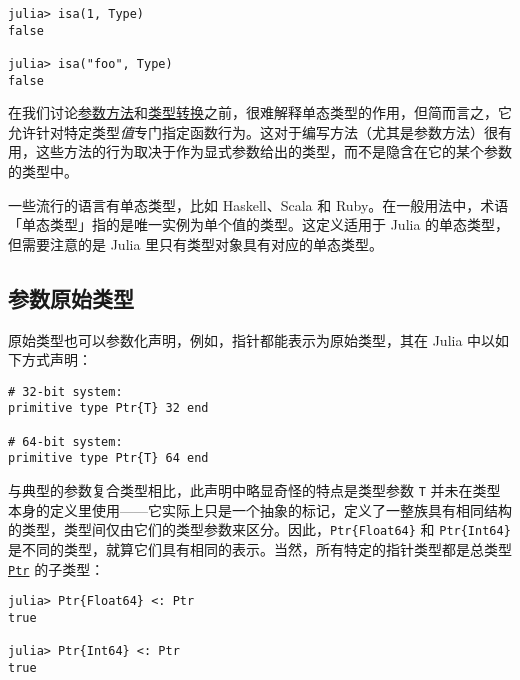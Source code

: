 \begin{verbatim}
julia> isa(1, Type)
false

julia> isa("foo", Type)
false
\end{verbatim}



在我们讨论\hyperlink{5820282638415739482}{参数方法}和\hyperlink{10374023657104680331}{类型转换}之前，很难解释单态类型的作用，但简而言之，它允许针对特定类型\emph{值}专门指定函数行为。这对于编写方法（尤其是参数方法）很有用，这些方法的行为取决于作为显式参数给出的类型，而不是隐含在它的某个参数的类型中。



一些流行的语言有单态类型，比如 Haskell、Scala 和 Ruby。在一般用法中，术语「单态类型」指的是唯一实例为单个值的类型。这定义适用于 Julia 的单态类型，但需要注意的是 Julia 里只有类型对象具有对应的单态类型。



\hypertarget{2858316496912626713}{}


\subsection{参数原始类型}



原始类型也可以参数化声明，例如，指针都能表示为原始类型，其在 Julia 中以如下方式声明：




\begin{verbatim}
# 32-bit system:
primitive type Ptr{T} 32 end

# 64-bit system:
primitive type Ptr{T} 64 end
\end{verbatim}



与典型的参数复合类型相比，此声明中略显奇怪的特点是类型参数 \texttt{T} 并未在类型本身的定义里使用——它实际上只是一个抽象的标记，定义了一整族具有相同结构的类型，类型间仅由它们的类型参数来区分。因此，\texttt{Ptr\{Float64\}} 和 \texttt{Ptr\{Int64\}} 是不同的类型，就算它们具有相同的表示。当然，所有特定的指针类型都是总类型 \hyperlink{10630331440513004826}{\texttt{Ptr}} 的子类型：




\begin{verbatim}
julia> Ptr{Float64} <: Ptr
true

julia> Ptr{Int64} <: Ptr
true
\end{verbatim}



\hypertarget{1421020605730253291}{}


